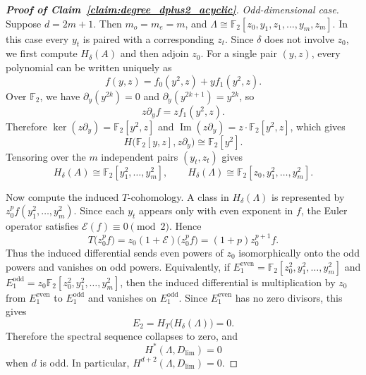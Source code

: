 \documentclass[aps,prx,reprint,superscriptaddress,twocolumn,amsmath,amssymb,amsfonts, nofootinbib]{revtex4-2}
\theoremstyle{apsstyle}
\begin{document}
\begin{proof}[\textnormal{\textbf{Proof of Claim~\ref{claim:degree_dplus2_acyclic}}}]
\noindent \textit{Odd-dimensional case.}
Suppose $d=2m+1$. Then $m_o=m_e=m$, and
$\Lambda\cong \mathbb F_2[z_0,y_1,z_1,\dots,y_m,z_m]$. In this case every $y_t$ is paired with a corresponding $z_t$. Since $\delta$ does not involve $z_0$, we first compute $H_\delta(A)$ and then adjoin $z_0$. For a single pair $(y,z)$, every polynomial can be written uniquely as
\begin{equation}
f(y,z)=f_0(y^2,z)+y f_1(y^2,z).
\end{equation}
Over $\mathbb F_2$, we have $\partial_y(y^{2k})=0$ and $\partial_y(y^{2k+1})=y^{2k}$, so
\begin{equation}
z\partial_y f=z f_1(y^2,z).
\end{equation}
Therefore $\ker(z\partial_y)=\mathbb F_2[y^2,z]$ and $\operatorname{Im}(z\partial_y)=z\cdot \mathbb F_2[y^2,z]$, which gives
\begin{equation}
H\bigl(\mathbb F_2[y,z],z\partial_y\bigr)
\cong
\mathbb F_2[y^2].
\end{equation}
Tensoring over the $m$ independent pairs $(y_t,z_t)$ gives
\begin{equation}
H_\delta(A)\cong \mathbb F_2[y_1^2,\dots,y_m^2],
\qquad
H_\delta(\Lambda)\cong \mathbb F_2[z_0,y_1^2,\dots,y_m^2].
\label{eq:Hdelta_result_odd}
\end{equation}

Now compute the induced $T$-cohomology. A class in $H_\delta(\Lambda)$ is represented by $z_0^p f(y_1^2,\dots,y_m^2)$. Since each $y_t$ appears only with even exponent in $f$, the Euler operator satisfies $\mathcal E(f)\equiv 0\pmod 2$. Hence
\begin{equation}
T\bigl(z_0^p f\bigr)
=
z_0(1+\mathcal E)\bigl(z_0^p f\bigr)
=
(1+p)z_0^{p+1}f.
\end{equation}
Thus the induced differential sends even powers of $z_0$ isomorphically onto the odd powers and vanishes on odd powers. Equivalently, if
$E_1^{\mathrm{even}}=\mathbb F_2[z_0^2,y_1^2,\dots,y_m^2]$ and
$E_1^{\mathrm{odd}}=z_0\mathbb F_2[z_0^2,y_1^2,\dots,y_m^2]$, then the induced differential is multiplication by $z_0$ from $E_1^{\mathrm{even}}$ to $E_1^{\mathrm{odd}}$ and vanishes on $E_1^{\mathrm{odd}}$. Since $E_1^{\mathrm{even}}$ has no zero divisors, this gives
\begin{equation}
E_2=H_T\bigl(H_\delta(\Lambda)\bigr)=0.
\end{equation}
Therefore the spectral sequence collapses to zero, and
\begin{equation}
H^*(\Lambda,D_{\lim})=0
\end{equation}
when $d$ is odd. In particular, $H^{d+2}(\Lambda,D_{\lim})=0$.


\end{proof}
\end{document}

